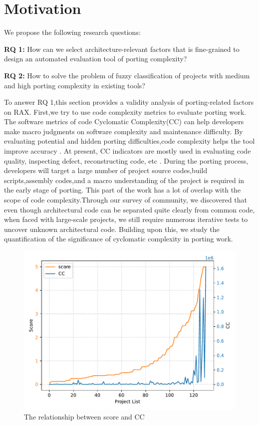 \documentclass[sigconf,screen,review,anonymous]{acmart}
\begin{document}
\section{Motivation}
We propose the following research questions:

\textbf{RQ 1:} How can we select architecture-relevant factors that is fine-grained to design an automated evaluation tool of porting complexity?

\textbf{RQ 2:} How to solve the problem of fuzzy classification of projects with medium and high porting complexity in existing tools?
 
To answer RQ 1,this section provides a validity analysis of porting-related factors on RAX.
First,we try to use code complexity metrics to evaluate porting work.
The software metrics of code Cyclomatic Complexity(CC) can help developers make macro judgments on software complexity and maintenance difficulty. By evaluating potential and hidden porting difficulties,code complexity helps the tool improve accuracy \cite{2005Exploring}.
At present, CC indicators are mostly used in evaluating code quality, inspecting defect, reconstructing code, etc \cite{1991Cyclomatic}.
During the porting process, developers will target a large number of project source codes,build scripts,assembly codes,and a macro understanding of the project is required in the early stage of porting.
This part of the work has a lot of overlap with the scope of code complexity.Through our survey of community, we discovered that even though architectural code can be separated quite clearly from common code, when faced with large-scale projects, we still require numerous iterative tests to uncover unknown architectural code. Building upon this, we study the quantification of the significance of cyclomatic complexity in porting work.
\begin{figure}
  \centering
  \includegraphics[width=\linewidth]{figure2.pdf}
  \caption{The relationship between score and CC}
  \label{fig:figure2}
\end{figure}
\end{document}
